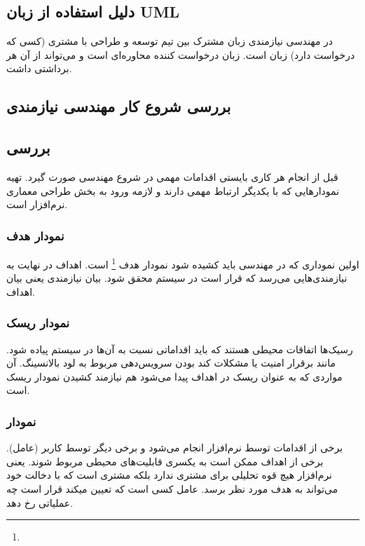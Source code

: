 \subsection{دلیل استفاده از زبان UML}

در مهندسی نیازمندی زبان مشترک بین تیم توسعه و طراحی با مشتری (کسی که درخواست
دارد) زبان  است. زبان درخواست کننده محاوره‌ای است و می‌تواند از آن هر
برداشتی داشت.

\subsection{بررسی شروع کار مهندسی نیازمندی}

\subsection{بررسی }

قبل از انجام هر کاری بایستی اقدامات مهمی در شروع مهندسی صورت گیرد. تهیه
نمودار‌هایی که با یکدیگر ارتباط مهمی دارند و لازمه ورود به بخش طراحی معماری
نرم‌افزار است.

\subsubsection{نمودار هدف}

اولین نموداری که در مهندسی باید کشیده شود نمودار هدف \footnote{} است. اهداف در نهایت به نیازمندی‌هایی می‌رسد که قرار است در سیستم محقق
شود. بیان نیازمندی یعنی بیان اهداف.

\subsubsection{نمودار ریسک}

رسیک‌ها اتفاقات محیطی هستند که باید اقداماتی نسبت به آن‌ها در سیستم پیاده شود.
مانند برقرار امنیت یا مشکلات کند بودن سرویس‌دهی مربوط به لود بالانسینگ. آن
مواردی که به عنوان ریسک در اهداف پیدا می‌شود هم نیازمند کشیدن نمودار ریسک است.

\subsubsection{نمودار }

برخی از اقدامات توسط نرم‌افزار انجام می‌شود و برخی دیگر توسط کاربر (عامل). برخی
از اهداف ممکن است به یکسری قابلیت‌های محیطی مربوط شوند. یعنی نرم‌افزار هیچ قوه
تحلیلی برای مشتری ندارد بلکه مشتری است که با دخالت خود می‌تواند به هدف مورد نظر
برسد. عامل کسی است که تعیین میکند قرار است چه عملیاتی رخ دهد.

